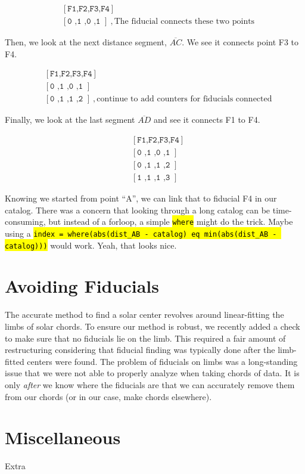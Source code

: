 \documentclass[10pt]{scrartcl}
\begin{document}
\begin{align}
  &[\texttt{F1,F2,F3,F4}]\\
  &[\texttt{0 ,1 ,0 ,1 }]~,\textrm{The fiducial connects these two points}
\end{align}

Then, we look at the next distance segment, $\overline{AC}$. We see it connects point F3 to F4.

\begin{align}
  &[\texttt{F1,F2,F3,F4}]\\
  &[\texttt{0 ,1 ,0 ,1 }]\\
  &[\texttt{0 ,1 ,1 ,2 }]~,\textrm{continue to add counters for fiducials connected}
\end{align}

Finally, we look at the last segment $\overline{AD}$ and see it connects F1 to F4.

\begin{align}
  &[\texttt{F1,F2,F3,F4}]\\
  &[\texttt{0 ,1 ,0 ,1 }]\\
  &[\texttt{0 ,1 ,1 ,2 }]\\
  &[\texttt{1 ,1 ,1 ,3 }]
\end{align}


Knowing we started from point ``A'', we can link that to fiducial F4 in our catalog. There was a concern that looking through a long catalog can be time-consuming, but instead of a forloop, a simple \hl{\texttt{where}} might do the trick. Maybe using a \hl{\texttt{index = where(abs(dist\_AB - catalog) eq min(abs(dist\_AB - catalog)))}} would work. Yeah, that looks nice.


\section{Avoiding Fiducials} %
\label{sec:avoiding_fiducials}
The accurate method to find a solar center revolves around linear-fitting the limbs of solar chords. To ensure our method is robust, we recently added a check to make sure that no fiducials lie on the limb. This required a fair amount of restructuring considering that fiducial finding was typically done after the limb-fitted centers were found. The problem of fiducials on limbs was a long-standing issue that we were not able to properly analyze when taking chords of data. It is only \emph{after} we know where the fiducials are that we can accurately remove them from our chords (or in our case, make chords elsewhere).

\section{Miscellaneous} %
\label{sec:miscellaneous}
Extra
\end{document}
